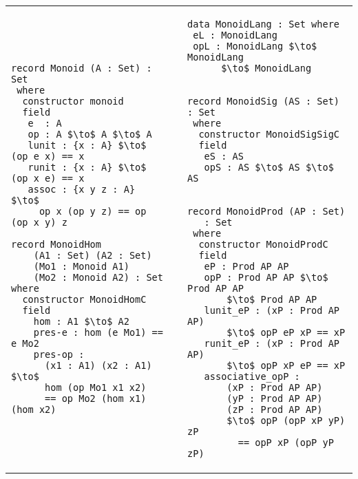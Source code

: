 \begin{adjustbox}{width=\columnwidth,center}
    \begin{tabular}{p{7cm} p{2mm} p{7cm}}        
\lstset{backgroundcolor=\color{ourblue}}
\begin{lstlisting}[mathescape]
record Monoid (A : Set) : Set 
 where
  constructor monoid
  field
   e  : A
   op : A $\to$ A $\to$ A
   lunit : {x : A} $\to$ (op e x) == x
   runit : {x : A} $\to$ (op x e) == x
   assoc : {x y z : A} $\to$ 
     op x (op y z) == op (op x y) z
\end{lstlisting}
\lstset{backgroundcolor=\color{ourpink}}
\begin{lstlisting}[mathescape]
record MonoidHom 
    (A1 : Set) (A2 : Set)
    (Mo1 : Monoid A1)
    (Mo2 : Monoid A2) : Set where
  constructor MonoidHomC
  field
    hom : A1 $\to$ A2
    pres-e : hom (e Mo1) == e Mo2
    pres-op : 
      (x1 : A1) (x2 : A1) $\to$
      hom (op Mo1 x1 x2) 
      == op Mo2 (hom x1) (hom x2)
\end{lstlisting}
&
&
\lstset{backgroundcolor=\color{ourpink}}
\begin{lstlisting}[mathescape]
data MonoidLang : Set where
 eL : MonoidLang
 opL : MonoidLang $\to$ MonoidLang 
      $\to$ MonoidLang


record MonoidSig (AS : Set) : Set 
 where
  constructor MonoidSigSigC
  field
   eS : AS
   opS : AS $\to$ AS $\to$ AS    
    
    
record MonoidProd (AP : Set) 
   : Set 
 where
  constructor MonoidProdC
  field
   eP : Prod AP AP
   opP : Prod AP AP $\to$ Prod AP AP 
       $\to$ Prod AP AP
   lunit_eP : (xP : Prod AP AP) 
       $\to$ opP eP xP == xP
   runit_eP : (xP : Prod AP AP) 
       $\to$ opP xP eP == xP
   associative_opP : 
       (xP : Prod AP AP) 
       (yP : Prod AP AP) 
       (zP : Prod AP AP) 
       $\to$ opP (opP xP yP) zP 
         == opP xP (opP yP zP)   
\end{lstlisting}
\end{tabular}  
\end{adjustbox}
